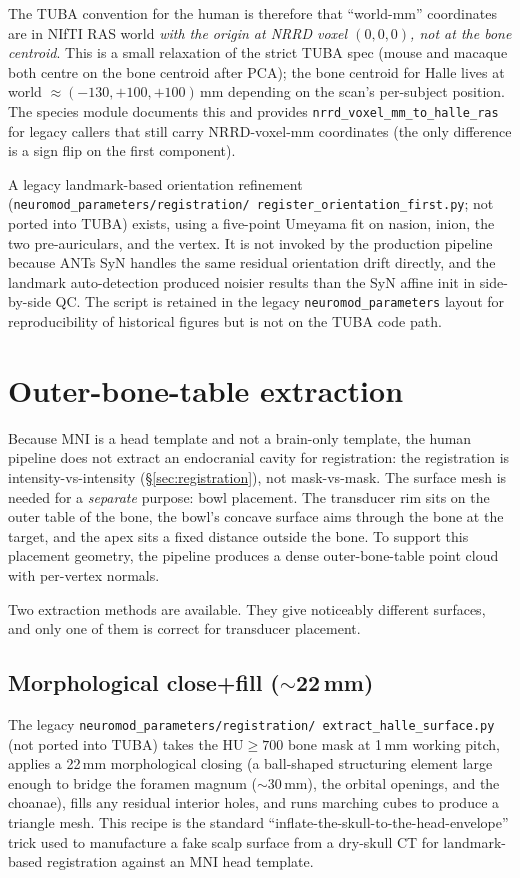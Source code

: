 \documentclass{compactarticle}
\begin{document}
The TUBA convention for the human is therefore that ``world-mm''
coordinates are in NIfTI RAS world {\em with the origin at NRRD voxel
$(0,0,0)$, not at the bone centroid}. This is a small relaxation of
the strict TUBA spec (mouse and macaque both centre on the bone
centroid after PCA); the bone centroid for Halle lives at world
$\approx (-130, +100, +100)$\,mm depending on the scan's per-subject
position. The species module documents this and provides
\texttt{nrrd\_voxel\_mm\_to\_halle\_ras} for legacy callers that still
carry NRRD-voxel-mm coordinates (the only difference is a sign flip on
the first component).

A legacy landmark-based orientation refinement
(\texttt{neuromod\_parameters/\allowbreak registration/\allowbreak
register\_orientation\_first.py}; not ported into TUBA) exists, using
a five-point Umeyama fit on nasion, inion, the two pre-auriculars, and
the vertex. It is not invoked by the production pipeline because ANTs
SyN handles the same residual orientation drift directly, and the
landmark auto-detection produced noisier results than the SyN affine
init in side-by-side QC. The script is retained in the legacy
\texttt{neuromod\_parameters} layout for reproducibility of historical
figures but is not on the TUBA code path.

\section{Outer-bone-table extraction}\label{sec:surface}
Because MNI is a head template and not a brain-only template,
the human pipeline does not extract an endocranial cavity for
registration: the registration is intensity-vs-intensity (\S\ref{sec:registration}),
not mask-vs-mask. The surface mesh is needed for a {\em separate}
purpose: bowl placement. The transducer rim sits on the outer table
of the bone, the bowl's concave surface aims through the bone at the
target, and the apex sits a fixed distance outside the bone. To support
this placement geometry, the pipeline produces a dense outer-bone-table
point cloud with per-vertex normals.

Two extraction methods are available. They give noticeably different
surfaces, and only one of them is correct for transducer placement.

\subsection{Morphological close+fill ($\sim$22\,mm)}
\label{sec:surface_closefill}
The legacy
\texttt{neuromod\_parameters/\allowbreak registration/\allowbreak
extract\_halle\_surface.py} (not ported into TUBA) takes the
$\mathrm{HU}\geq 700$ bone mask at 1\,mm working pitch, applies a 22\,mm
morphological closing (a ball-shaped structuring element large enough
to bridge the foramen magnum ($\sim$30\,mm), the orbital openings, and
the choanae), fills any residual interior holes, and runs marching cubes
to produce a triangle mesh. This recipe is the standard
``inflate-the-skull-to-the-head-envelope'' trick used to manufacture a
fake scalp surface from a dry-skull CT for landmark-based registration
against an MNI head template.
\end{document}
